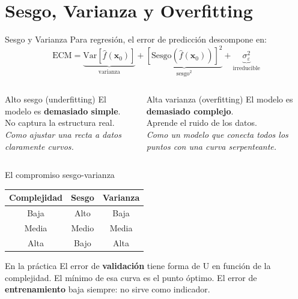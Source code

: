 \documentclass[aspectratio=169]{beamer}
\newcommand{\bx}{\bm{x}}
\begin{document}
\section{Sesgo, Varianza y Overfitting}

\begin{frame}{Sesgo y Varianza}
  Para regresión, el error de predicción descompone en:
  \[
    \text{ECM} = \underbrace{\text{Var}[\hat{f}(\bx_0)]}_{\text{varianza}}
              + \underbrace{[\text{Sesgo}(\hat{f}(\bx_0))]^2}_{\text{sesgo}^2}
              + \underbrace{\sigma^2_\varepsilon}_{\text{irreducible}}
  \]

  \medskip
  \begin{columns}
    \begin{block}{Alto sesgo (underfitting)}
      El modelo es \textbf{demasiado simple}.\\
      No captura la estructura real.\\[4pt]
      \textit{Como ajustar una recta a datos claramente curvos.}
    \end{block}

    \begin{block}{Alta varianza (overfitting)}
      El modelo es \textbf{demasiado complejo}.\\
      Aprende el ruido de los datos.\\[4pt]
      \textit{Como un modelo que conecta todos los puntos con una curva serpenteante.}
    \end{block}
  \end{columns}
\end{frame}

\begin{frame}{El compromiso sesgo-varianza}
  \begin{center}
    \begin{tabular}{ccc}
      \toprule
      \textbf{Complejidad} & \textbf{Sesgo} & \textbf{Varianza} \\
      \midrule
      Baja  & Alto  & Baja \\
      Media & Medio & Media \\
      Alta  & Bajo  & Alta  \\
      \bottomrule
    \end{tabular}
  \end{center}

  \medskip
  \begin{exampleblock}{En la práctica}
    El error de \textbf{validación} tiene forma de U en función de la complejidad.
    El mínimo de esa curva es el punto óptimo.
    El error de \textbf{entrenamiento} baja siempre: no sirve como indicador.
  \end{exampleblock}
\end{frame}
\end{document}
